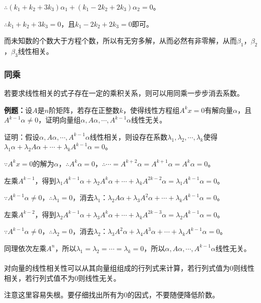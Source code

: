 $\therefore(k_1+k_2+3k_3)\alpha_1+(k_1-2k_2+2k_3)\alpha_2=0$。

$\therefore k_1+k_2+3k_3=0$，且$k_1-2k_2+2k_3=0$即可。

而未知数的个数大于方程个数，所以有无穷多解，从而必然有非零解，从而$\beta_1$，$\beta_2$，$\beta_3$线性相关。

\subsubsection{同乘}

若要求线性相关的式子存在一定的乘积关系，则可以用同乘一步步消去系数。

\textbf{例题：}设$A$是$n$阶矩阵，若存在正整数$k$，使得线性方程组$A^kx=0$有解向量$\alpha$，且$A^{k-1}\alpha\neq0$，证明向量组$\alpha,A\alpha,\cdots,A^{k-1}\alpha$线性无关。

证明：假设$\alpha,A\alpha,\cdots,A^{k-1}\alpha$线性相关，则设存在系数$\lambda_1,\lambda_2,\cdots,\lambda_k$使得$\lambda_1\alpha+\lambda_2A\alpha+\cdots+\lambda_kA^{k-1}\alpha=0$。

$\because A^kx=0$的解为$\alpha$，$\therefore A^k\alpha=0$，$\therefore\cdots=A^{k+2}\alpha=A^{k+1}\alpha=A^k\alpha=0$。

左乘$A^{k-1}$，得到$\lambda_1A^{k-1}\alpha+\lambda_2A^k\alpha+\cdots+\lambda_kA^{2k-2}\alpha=\lambda_1A^{k-1}\alpha=0$。

$\because A^{k-1}\alpha\neq0$，$\therefore\lambda_1=0$，消去$\lambda_1$：$\lambda_2A\alpha+\lambda_3A^2\alpha+\cdots+\lambda_kA^{k-1}\alpha=0$。

左乘$A^{k-2}$，得到$\lambda_2A^{k-1}\alpha+\lambda_3A^k\alpha+\cdots+\lambda_kA^{2k-3}\alpha=\lambda_2A^{k-1}\alpha=0$。

$\because A^{k-1}\alpha\neq0$，$\therefore\lambda_2=0$，消去$\lambda_2$：$\lambda_3A^2\alpha+\lambda_4A^3\alpha+\cdots+\lambda_kA^{k-1}\alpha=0$。

同理依次左乘$A^n$，所以$\lambda_1=\lambda_2=\cdots=\lambda_k=0$，所以$\alpha,A\alpha,\cdots,A^{k-1}\alpha$线性无关。

\paragraph{}

对向量的线性相关性可以从其向量组组成的行列式来计算，若行列式值为0则线性相关，若行列式值不为0则线性无关。

注意这里容易失根。要仔细找出所有为0的因式，不要随便降低阶数。

